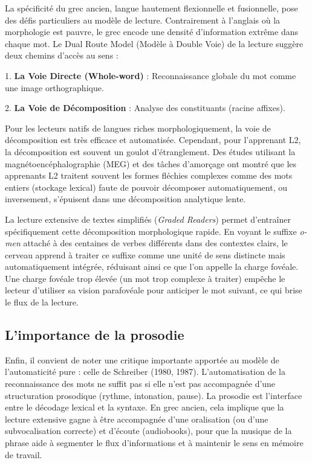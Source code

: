 La spécificité du grec ancien, langue hautement flexionnelle et fusionnelle, pose des défis
particuliers au modèle de lecture. Contrairement à l'anglais où la morphologie est pauvre, le grec
encode une densité d'information extrême dans chaque mot. Le \og Dual Route Model\fg{} (Modèle à
Double Voie) de la lecture suggère deux chemins d'accès au sens :

1. \textbf{La Voie Directe (Whole-word)} : Reconnaissance globale du mot comme une image
orthographique.

2. \textbf{La Voie de Décomposition} : Analyse des constituants (racine \+
affixes).\cite{III-3-2-ref8}

Pour les lecteurs natifs de langues riches morphologiquement, la voie de décomposition est très
efficace et automatisée. Cependant, pour l'apprenant L2, la décomposition est souvent un goulot
d'étranglement. Des études utilisant la magnétoencéphalographie (MEG) et des tâches d'amorçage ont
montré que les apprenants L2 traitent souvent les formes fléchies complexes comme des mots entiers
(stockage lexical) faute de pouvoir décomposer automatiquement, ou inversement, s'épuisent dans une
décomposition analytique lente.\cite{III-3-2-ref10}

La lecture extensive de textes simplifiés (\textit{Graded Readers}) permet d'entraîner
spécifiquement cette décomposition morphologique rapide. En voyant le suffixe \textit{\-o-men}
attaché à des centaines de verbes différents dans des contextes clairs, le cerveau apprend à traiter
ce suffixe comme une unité de sens distincte mais automatiquement intégrée, réduisant ainsi ce que
l'on appelle la \og charge fovéale\fg{}.\cite{III-3-2-ref12} Une charge fovéale trop élevée (un mot
trop complexe à traiter) empêche le lecteur d'utiliser sa vision parafovéale pour anticiper le mot
suivant, ce qui brise le flux de la lecture.\cite{III-3-2-ref14}



\subsection{L'importance de la prosodie}

Enfin, il convient de noter une critique importante apportée au modèle de l'automaticité pure :
celle de Schreiber (1980, 1987). L'automatisation de la reconnaissance des mots ne suffit pas si
elle n'est pas accompagnée d'une structuration prosodique (rythme, intonation, pause). La prosodie
est l'interface entre le décodage lexical et la syntaxe.\cite{III-3-2-ref16} En grec ancien, cela
implique que la lecture extensive gagne à être accompagnée d'une oralisation (ou d'une
subvocalisation correcte) et d'écoute (audiobooks), pour que la \og musique\fg{} de la phrase aide à
segmenter le flux d'informations et à maintenir le sens en mémoire de travail.\cite{III-3-2-ref17}



